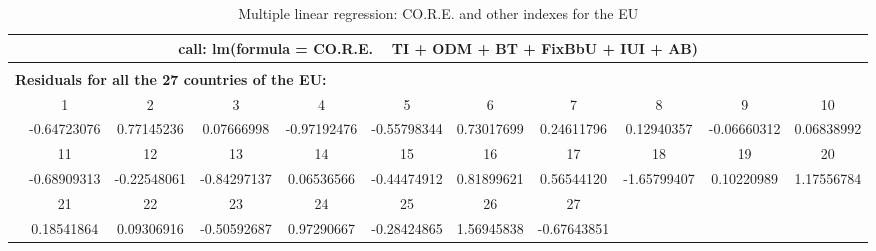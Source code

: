\documentclass[a4paper, twoside]{report}
\begin{document}
\begin{landscape}
\thispagestyle{empty}
\begin{table}[htbp]
  \centering
  \caption{Multiple linear regression: CO.R.E. and other indexes for the EU}
   \tabcolsep=0.60cm
	\renewcommand{\arraystretch}{1.3}
	\begin{adjustbox}{max width=\linewidth}
       \begin{tabular}{lllllllllll}
    \toprule
    \multicolumn{11}{c}{\textbf{call: lm(formula = CO.R.E. ~ TI + ODM + BT + FixBbU + IUI + AB)}} \\
    \midrule
    \multicolumn{11}{c}{} \\
    \midrule
    \multicolumn{11}{l}{\textbf{Residuals for all the 27 countries of the EU:}} \\
          & \multicolumn{1}{c}{1} & \multicolumn{1}{c}{2} & \multicolumn{1}{c}{3} & \multicolumn{1}{c}{4} & \multicolumn{1}{c}{5} & \multicolumn{1}{c}{6} & \multicolumn{1}{c}{7} & \multicolumn{1}{c}{8} & \multicolumn{1}{c}{9} & \multicolumn{1}{c}{10} \\
          & \multicolumn{1}{c}{-0.64723076} & \multicolumn{1}{c}{0.77145236 } & \multicolumn{1}{c}{ 0.07666998 } & \multicolumn{1}{c}{-0.97192476} & \multicolumn{1}{c}{-0.55798344} & \multicolumn{1}{c}{0.73017699} & \multicolumn{1}{c}{0.24611796} & \multicolumn{1}{c}{ 0.12940357} & \multicolumn{1}{c}{-0.06660312} & \multicolumn{1}{c}{0.06838992} \\
          & \multicolumn{1}{c}{11} & \multicolumn{1}{c}{12} & \multicolumn{1}{c}{13} & \multicolumn{1}{c}{14} & \multicolumn{1}{c}{15} & \multicolumn{1}{c}{16} & \multicolumn{1}{c}{17} & \multicolumn{1}{c}{18} & \multicolumn{1}{c}{19} & \multicolumn{1}{c}{20} \\
          & \multicolumn{1}{c}{-0.68909313} & \multicolumn{1}{c}{-0.22548061} & \multicolumn{1}{c}{-0.84297137} & \multicolumn{1}{c}{0.06536566 } & \multicolumn{1}{c}{-0.44474912} & \multicolumn{1}{c}{  0.81899621} & \multicolumn{1}{c}{0.56544120} & \multicolumn{1}{c}{-1.65799407} & \multicolumn{1}{c}{0.10220989} & \multicolumn{1}{c}{1.17556784} \\
          & \multicolumn{1}{c}{21} & \multicolumn{1}{c}{22} & \multicolumn{1}{c}{23} & \multicolumn{1}{c}{24} & \multicolumn{1}{c}{25} & \multicolumn{1}{c}{26} & \multicolumn{1}{c}{27} &       &       &  \\
          & \multicolumn{1}{c}{0.18541864 } & \multicolumn{1}{c}{ 0.09306916 } & \multicolumn{1}{c}{-0.50592687} & \multicolumn{1}{c}{0.97290667} & \multicolumn{1}{c}{-0.28424865} & \multicolumn{1}{c}{1.56945838} & \multicolumn{1}{c}{-0.67643851} &       &       &  \\

\end{tabular}
\end{adjustbox}
\end{table}
\end{landscape}
\end{document}
